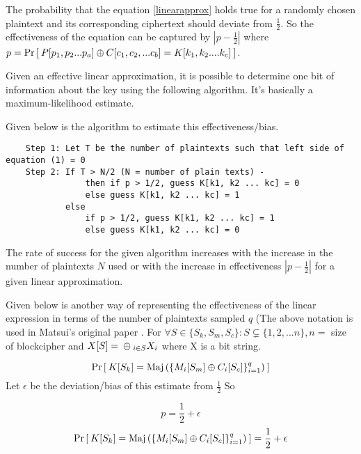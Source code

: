 The probability that the equation \eqref{linearapprox} holds true for a randomly chosen plaintext and its corresponding ciphertext should deviate from $\frac{1}{2}$. So the effectiveness of the equation can be captured by \( |p - \frac{1}{2}|\) where \( p = \Pr\left[\: P[p_1, p_2 ... p_a] {\:\oplus\:} C[c_1, c_2, ... c_b] = K[k_1, k_2 .... k_c] \:\right]\). \newline

Given an effective linear approximation, it is possible to determine one bit of information about the key using the following algorithm. It's basically a maximum-likelihood estimate. \newline

Given below is the algorithm to estimate this effectiveness/bias.

\begin{verbatim}
    Step 1: Let T be the number of plaintexts such that left side of equation (1) = 0
    Step 2: If T > N/2 (N = number of plain texts) - 
                then if p > 1/2, guess K[k1, k2 ... kc] = 0 
                else guess K[k1, k2 ... kc] = 1
            else  
                if p > 1/2, guess K[k1, k2 ... kc] = 1 
                else guess K[k1, k2 ... kc] = 0
\end{verbatim}


The rate of success for the given algorithm increases with the increase in the number of plaintexts $N$ used or  with the increase in effectiveness \( |p - \frac{1}{2}|\) for a given linear approximation. \newline

\par Given below is another way of representing the effectiveness of the linear expression in terms of the number of plaintexts sampled \( q \) (The above notation is used in Matsui's original paper \cite{MatsuiDES}. 
For \( \forall S \in \{S_k, S_m, S_c\}: S \subsetneq \{1, 2, ... n\}, n =\) size of blockcipher and \( X[S] = {\:\oplus\:}_{i \in S} X_i  \) where X is a bit string.

\[  \Pr\left[\: K[S_k] = \textnormal{Maj}\left(\{M_i[S_m]\oplus C_i[S_c]\}_{i=1}^q\right) \:\right] \]
Let  $\epsilon$ be the deviation/bias of this estimate from $\frac{1}{2}$ So

\[ p = \frac{1}{2} + \epsilon \]
\[  \Pr\left[\: K[S_k] = \textnormal{Maj}\left(\{M_i[S_m]\oplus C_i[S_c]\}_{i=1}^q\right) \:\right]  =  \frac{1}{2} + \epsilon\]

